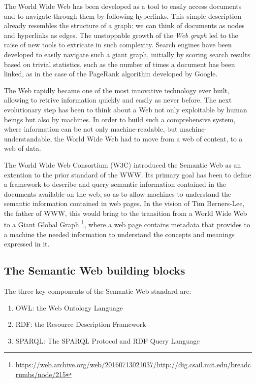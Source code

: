 \documentclass[%
    corpo=13.5pt,
    twoside,
    oldstyle,
    tipotesi=magistrale,
    greek,
    evenboxes
]{toptesi}
\begin{document}
The World Wide Web has been developed as a tool to easily access
documents and to navigate through them by following hyperlinks.
This simple description already resembles the structure of a graph: we can
think of documents as nodes and hyperlinks as edges. The unstoppable growth
of the \emph{Web graph} led to the raise of new tools to extricate in such
complexity. Search engines have been developed to easily navigate such a giant
graph, initially by scoring search results based on trivial statistics, such
as the number of times a document has been linked, as in the case of the
PageRank \cite{page1999} algorithm developed by Google.
\newline

The Web rapidly became one of the most innovative technology ever built,
allowing to retrive information quickly and easily as never before.
The next evolutionary step has been to think about a Web not only exploitable by
human beings but also by machines. In order to build such a comprehensive
system, where information can be not only machine-readable, but
machine-understandable, the World Wide Web had to move from a web of content, to
a web of data.
\newline

The World Wide Web Consortium (W3C) introduced the Semantic Web as an extention
to the prior standard of the WWW. Its primary goal has been
to define a framework to describe and query semantic information contained
in the documents available on the web, so as to allow machines to understand
the semantic information contained in web pages. In the vision of Tim
Berners-Lee, the father of WWW, this would bring to the transition from a
World Wide Web to a Giant Global Graph
\footnote{\url{https://web.archive.org/web/20160713021037/http://dig.csail.mit.edu/breadcrumbs/node/215}},
where a web page contains metadata that provides to a machine the needed
information to understand the concepts and meanings expressed in it.


\subsection{The Semantic Web building blocks}

The three key components of the Semantic Web standard are:
\begin{enumerate}
\item OWL: the Web Ontology Language
\item RDF: the Resource Description Framework
\item SPARQL: The SPARQL Protocol and RDF Query Language
\end{enumerate}
\bigskip
\end{document}
